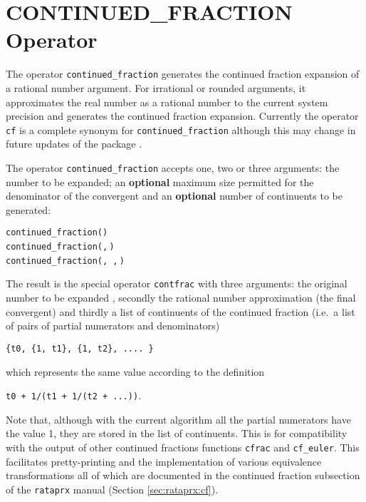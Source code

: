 \section{CONTINUED\_FRACTION Operator}
\hypertarget{operator:CONTINUED_FRACTION}{}
\hypertarget{operator:CONTFRAC}{}

The operator \texttt{continued\_fraction}
generates the continued fraction expansion of a rational number argument.
For irrational or rounded arguments, it approximates the real number
as a rational number to the current system precision and generates
the continued fraction expansion. Currently the operator \texttt{cf} is a
complete synonym for \texttt{continued\_fraction} although this may change
in future updates of the package .

The operator \texttt{continued\_fraction} accepts one, two or
three arguments: the number to be expanded; an \textbf{optional} maximum size
permitted for the denominator of the convergent
and an \textbf{optional} number of continuents to be generated:
\begin{syntaxtable}
  \texttt{continued\_fraction(}\texttt{)}\\
  \texttt{continued\_fraction(}\texttt{,}\,\texttt{)}\\
  \texttt{continued\_fraction(}\texttt{,}\,%
  \texttt{,}\,\texttt{)}
\end{syntaxtable}
The result is the special operator \texttt{contfrac}
with three arguments: the original number to be expanded
, secondly the rational number approximation (the final convergent)
and thirdly a list of continuents of the continued fraction (i.e.\ a list of
pairs of partial numerators and denominators)

\hspace{10mm}\texttt{\{t0, \{1, t1\}, \{1, t2\}, .... \}}

which represents the same value according to the definition

\hspace{10mm}\texttt{t0 + 1/(t1 + 1/(t2 + ...))}.

Note that, although with the current
algorithm all the partial numerators have the value 1, they are stored
in the list of continuents. This is for compatibility with the output of
other continued fractions functions \texttt{cfrac} and \texttt{cf\_euler}.
This facilitates pretty-printing and the implementation of various equivalence
transformations all of which are documented in the continued fraction
subsection of the \texttt{rataprx} manual (Section \ref{sec:rataprx:cf}).

